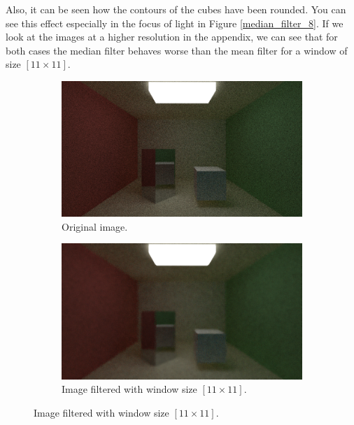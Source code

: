 \documentclass[titlepage,12pt]{report}
\begin{document}
Also, it can be seen how the contours of the cubes have been rounded. You can see this effect especially in the focus of light in Figure \ref{median_filter_8}. If we look at the images at a higher resolution in the appendix, we can see that for both cases the median filter behaves worse than the mean filter for a window of size $[11\times 11]$.


\begin{figure}[H]
	\centering
	\begin{subfigure}{.48\textwidth}
		\centering
		\includegraphics[scale=0.2]{media/cornell_normal_50.png}
		\caption{Original image.}
		\label{median_filter_5}
	\end{subfigure}
	\begin{subfigure}{.48\textwidth}
		\centering
		\includegraphics[scale=0.2]{media/median/cornell_normal_50_median_filter_11.png}
		\caption{Image filtered with window size $[11 \times 11]$.}
		\label{median_filter_6}
	\end{subfigure}


\end{figure}
\end{document}
